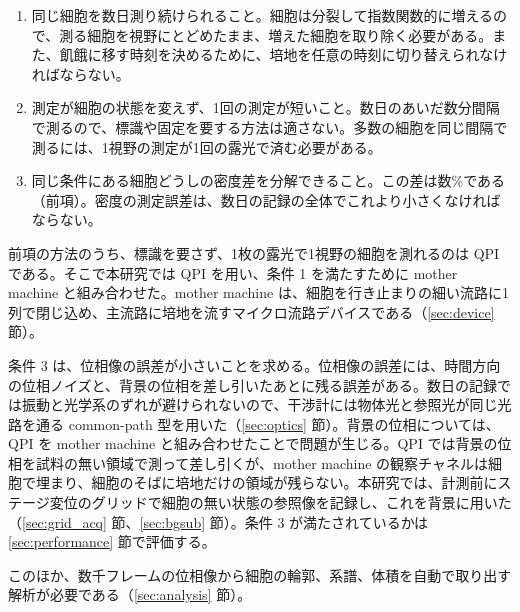 \begin{enumerate}
\item 同じ細胞を数日測り続けられること。細胞は分裂して指数関数的に増えるので、測る細胞を視野にとどめたまま、増えた細胞を取り除く必要がある。また、飢餓に移す時刻を決めるために、培地を任意の時刻に切り替えられなければならない。
\item 測定が細胞の状態を変えず、1回の測定が短いこと。数日のあいだ数分間隔で測るので、標識や固定を要する方法は適さない。多数の細胞を同じ間隔で測るには、1視野の測定が1回の露光で済む必要がある。
\item 同じ条件にある細胞どうしの密度差を分解できること。この差は数\%である（前項）。密度の測定誤差は、数日の記録の全体でこれより小さくなければならない。
\end{enumerate}

前項の方法のうち、標識を要さず、1枚の露光で1視野の細胞を測れるのは QPI である。そこで本研究では QPI を用い、条件 1 を満たすために mother machine と組み合わせた。mother machine は、細胞を行き止まりの細い流路に1列で閉じ込め、主流路に培地を流すマイクロ流路デバイスである\cite{wang2010robust,nakaoka2017aging}（\ref{sec:device} 節）。

条件 3 は、位相像の誤差が小さいことを求める。位相像の誤差には、時間方向の位相ノイズと、背景の位相を差し引いたあとに残る誤差がある。数日の記録では振動と光学系のずれが避けられないので、干渉計には物体光と参照光が同じ光路を通る common-path 型を用いた（\ref{sec:optics} 節）。背景の位相については、QPI を mother machine と組み合わせたことで問題が生じる。QPI では背景の位相を試料の無い領域で測って差し引くが、mother machine の観察チャネルは細胞で埋まり、細胞のそばに培地だけの領域が残らない。本研究では、計測前にステージ変位のグリッドで細胞の無い状態の参照像を記録し、これを背景に用いた（\ref{sec:grid_acq} 節、\ref{sec:bgsub} 節）。条件 3 が満たされているかは \ref{sec:performance} 節で評価する。

このほか、数千フレームの位相像から細胞の輪郭、系譜、体積を自動で取り出す解析が必要である（\ref{sec:analysis} 節）。

%
%
%

